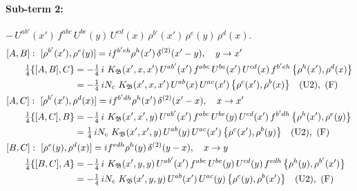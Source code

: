 \documentclass[10pt]{article}
\numberwithin{equation}{section}
\begin{document}
\paragraph{Sub-term 2:} $-\,U^{ab'}(x')\,f^{abc}\,U^{be}(y)\,U^{cd}(x)\,\rho^{b'}(x')\,\rho^{e}(y)\,\rho^{d}(x)$.
\begin{align}
&[A,B]:\ [\rho^{b'}(x'),\rho^{e}(y)]=i f^{b'eh}\rho^{h}(x')\,\delta^{(2)}(x'-y),\quad y\to x'\notag\\
&\qquad \tfrac14\{[A,B],C\}=-\tfrac14\,i\,\,K_{\mathfrak B}(x',x,x')\,U^{ab'}(x')\,f^{abc}\,U^{be}(x')\,U^{cd}(x)\,f^{b'eh}\,\big\{\rho^{h}(x'),\rho^{d}(x)\big\}\notag\\
&\qquad\phantom{\tfrac14\{[A,B],C\}}=-\tfrac14\,i N_{c}\,\,K_{\mathfrak B}(x',x,x')\,U^{ab}(x)\,U^{ac}(x')\,\big\{\rho^{c}(x'),\rho^{b}(x)\big\}\quad\text{(U2)},\ \text{(F)}
\label{eq:GI.IV-2-AB}\\
&[A,C]:\ [\rho^{b'}(x'),\rho^{d}(x)]=i f^{b'dh}\rho^{h}(x')\,\delta^{(2)}(x'-x),\quad x\to x'\notag\\
&\qquad \tfrac14\{[A,C],B\}=-\tfrac14\,i\,\,K_{\mathfrak B}(x',x',y)\,U^{ab'}(x')\,f^{abc}\,U^{be}(y)\,U^{cd}(x')\,f^{b'dh}\,\big\{\rho^{h}(x'),\rho^{e}(y)\big\}\notag\\
&\qquad\phantom{\tfrac14\{[A,C],B\}}=\tfrac14\,i N_{c}\,\,K_{\mathfrak B}(x',x',y)\,U^{ab}(y)\,U^{ac}(x')\,\big\{\rho^{c}(x'),\rho^{b}(y)\big\}\quad\text{(U2)},\ \text{(F)}
\label{eq:GI.IV-2-AC}\\
&[B,C]:\ [\rho^{e}(y),\rho^{d}(x)]=i f^{edh}\rho^{h}(y)\,\delta^{(2)}(y-x),\quad x\to y\notag\\
&\qquad \tfrac14\{[B,C],A\}=-\tfrac14\,i\,\,K_{\mathfrak B}(x',y,y)\,U^{ab'}(x')\,f^{abc}\,U^{be}(y)\,U^{cd}(y)\,f^{edh}\,\big\{\rho^{h}(y),\rho^{b'}(x')\big\}\notag\\
&\qquad\phantom{\tfrac14\{[B,C],A\}}=-\tfrac14\,i N_{c}\,\,K_{\mathfrak B}(x',y,y)\,U^{ab}(x')\,U^{ac}(y)\,\big\{\rho^{c}(y),\rho^{b}(x')\big\}\quad\text{(U2)},\ \text{(F)}
\label{eq:GI.IV-2-BC}
\end{align}
\end{document}

